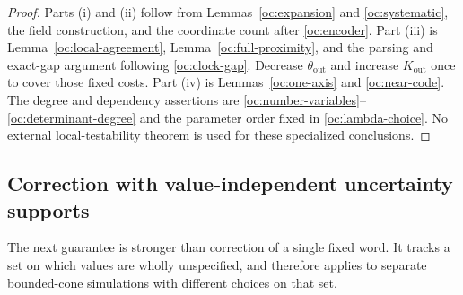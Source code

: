 \begin{proof}
Parts (i) and (ii) follow from Lemmas~\ref{oc:expansion} and
\ref{oc:systematic}, the field construction, and the coordinate
count after \eqref{oc:encoder}.  Part (iii) is
Lemma~\ref{oc:local-agreement}, Lemma~\ref{oc:full-proximity}, and
the parsing and exact-gap argument following \eqref{oc:clock-gap}.
Decrease $\theta_{\mathrm{out}}$ and increase $K_{\mathrm{out}}$ once to
cover those fixed costs.  Part (iv) is
Lemmas~\ref{oc:one-axis} and \ref{oc:near-code}.  The degree and
dependency assertions are \eqref{oc:number-variables}--
\eqref{oc:determinant-degree} and the parameter order fixed in
\eqref{oc:lambda-choice}.  No external local-testability theorem is
used for these specialized conclusions.
\end{proof}

\subsection{Correction with value-independent uncertainty supports}

The next guarantee is stronger than correction of a single fixed
word.  It tracks a set on which values are wholly unspecified, and
therefore applies to separate bounded-cone simulations with different
choices on that set.

